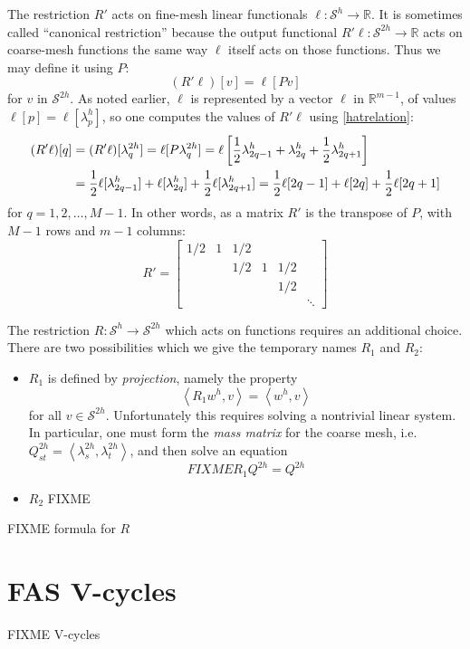 \documentclass[letterpaper,final,12pt,reqno]{amsart}
\newcommand{\RR}{\mathbb{R}}
\newcommand{\ip}[2]{\left<#1,#2\right>}
\begin{document}
The restriction $R'$ acts on fine-mesh linear functionals $\ell:\mathcal{S}^h \to \RR$.  It is sometimes called ``canonical restriction'' \cite{GraeserKornhuber2009} because the output functional $R'\ell:\mathcal{S}^{2h}\to \RR$ acts on coarse-mesh functions the same way $\ell$ itself acts on those functions.  Thus we may define it using $P$:
\begin{equation}
  (R'\ell)[v] = \ell[Pv]  \label{rprimedefinition}
\end{equation}
for $v$ in $\mathcal{S}^{2h}$.  As noted earlier, $\ell$ is represented by a vector $\bm{\ell}$ in $\RR^{m-1}$, of values $\ell[p] = \ell[\lambda_p^h]$, so one computes the values of $R'\ell$ using \eqref{hatrelation}:
\begin{align}
  (R'\ell)[q] &= (R'\ell)[\lambda_q^{2h}] = \ell[P\lambda_q^{2h}] = \ell\left[\frac{1}{2} \lambda_{2q-1}^h + \lambda_{2q}^h + \frac{1}{2} \lambda_{2q+1}^h\right]  \label{rprimeformula} \\
      &= \frac{1}{2} \ell[\lambda_{2q-1}^h] + \ell[\lambda_{2q}^h] + \frac{1}{2} \ell[\lambda_{2q+1}^h] = \frac{1}{2} \ell[2q-1] + \ell[2q] + \frac{1}{2} \ell[2q+1]  \notag
\end{align}
for $q=1,2,\dots,M-1$.  In other words, as a matrix $R'$ is the transpose of $P$, with $M-1$ rows and $m-1$ columns:
\begin{equation}
R' = \begin{bmatrix}
1/2 & 1 & 1/2 &   &     & \\
    &   & 1/2 & 1 & 1/2 & \\
    &   &     &   & 1/2 & \\
    &   &     &   &     & \ddots
\end{bmatrix} \label{rprimematrix}
\end{equation}

The restriction $R:\mathcal{S}^h\to\mathcal{S}^{2h}$ which acts on functions requires an additional choice.  There are two possibilities which we give the temporary names $R_1$ and $R_2$:
\begin{itemize}
\item $R_1$ is defined by \emph{projection}, namely the property
    $$\ip{R_1 w^h}{v} = \ip{w^h}{v}$$
for all $v\in \mathcal{S}^{2h}$.  Unfortunately this requires solving a nontrivial linear system.  In particular, one must form the \emph{mass matrix} for the coarse mesh, i.e.~$Q_{st}^{2h} = \ip{\lambda_s^{2h}}{\lambda_t^{2h}}$, and then solve an equation
    $$FIXME R_1 Q^{2h} = Q^{2h}$$
\item $R_2$ FIXME
\end{itemize}

FIXME formula for $R$



\section{FAS V-cycles}

FIXME V-cycles

\small

\bigskip


\end{document}
